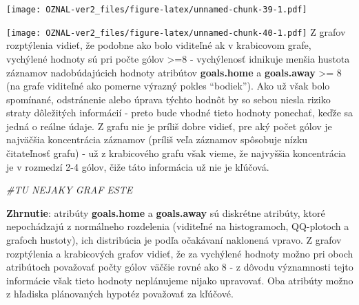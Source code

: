 \documentclass[
]{article}
\newenvironment{Shaded}{\begin{snugshade}}{\end{snugshade}}
\newcommand{\AttributeTok}[1]{\textcolor[rgb]{0.77,0.63,0.00}{#1}}
\newcommand{\CommentTok}[1]{\textcolor[rgb]{0.56,0.35,0.01}{\textit{#1}}}
\newcommand{\ConstantTok}[1]{\textcolor[rgb]{0.00,0.00,0.00}{#1}}
\newcommand{\DecValTok}[1]{\textcolor[rgb]{0.00,0.00,0.81}{#1}}
\newcommand{\FloatTok}[1]{\textcolor[rgb]{0.00,0.00,0.81}{#1}}
\newcommand{\FunctionTok}[1]{\textcolor[rgb]{0.00,0.00,0.00}{#1}}
\newcommand{\NormalTok}[1]{#1}
\newcommand{\SpecialCharTok}[1]{\textcolor[rgb]{0.00,0.00,0.00}{#1}}
\newcommand{\StringTok}[1]{\textcolor[rgb]{0.31,0.60,0.02}{#1}}
\begin{document}
\texttt{[image: OZNAL-ver2\_files/figure-latex/unnamed-chunk-39-1.pdf]}

\begin{Shaded}
\end{Shaded}

\texttt{[image: OZNAL-ver2\_files/figure-latex/unnamed-chunk-40-1.pdf]} Z
grafov rozptýlenia vidieť, že podobne ako bolo viditeľné ak v krabicovom
grafe, vychýlené hodnoty sú pri počte gólov \textgreater=8 - vychýlenosť
idnikuje menšia hustota záznamov nadobúdajúcich hodnoty atribútov
\textbf{goals.home} a \textbf{goals.away} \textgreater= 8 (na grafe
viditeľné ako pomerne výrazný pokles ``bodiek''). Ako už však bolo
spomínané, odstránenie alebo úprava týchto hodnôt by so sebou niesla
riziko straty dôležitých informácií - preto bude vhodné tieto hodnoty
ponechať, keďže sa jedná o reálne údaje. Z grafu nie je príliš dobre
vidieť, pre aký počet gólov je najväčšia koncentrácia záznamov (príliš
veľa záznamov spôsobuje nízku čitateľnosť grafu) - už z krabicového
grafu však vieme, že najvyššia koncentrácia je v rozmedzí 2-4 gólov,
čiže táto informácia už nie je kľúčová.

\begin{Shaded}
\begin{Highlighting}[]
\CommentTok{\#TU NEJAKY GRAF ESTE}
\end{Highlighting}
\end{Shaded}

\textbf{Zhrnutie}: atribúty \textbf{goals.home} a \textbf{goals.away} sú
diskrétne atribúty, ktoré nepochádzajú z normálneho rozdelenia
(viditeľné na histogramoch, QQ-plotoch a grafoch hustoty), ich
distribúcia je podľa očakávaní naklonená vpravo. Z grafov rozptýlenia a
krabicových grafov vidieť, že za vychýlené hodnoty možno pri oboch
atribútoch považovať počty gólov väčšie rovné ako 8 - z dôvodu
významnosti tejto informácie však tieto hodnoty neplánujeme nijako
upravovať. Oba atribúty možno z hľadiska plánovaných hypotéz považovať
za kľúčové.
\end{document}

